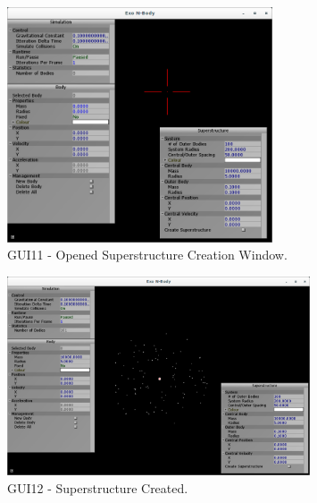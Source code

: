 \begin{figure}[H]
  \centering
  \includegraphics[width=0.7\textwidth]{img/testingEvidence/gui11.png}
  \caption{GUI11 - Opened Superstructure Creation Window.}
\end{figure}

\begin{figure}[H]
  \centering
  \includegraphics[width=0.8\textwidth]{img/testingEvidence/gui12.png}
  \caption{GUI12 - Superstructure Created.}
\end{figure}

